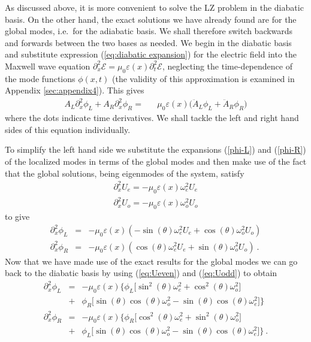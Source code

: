 \documentclass[twocolumn,english,pra,aps,superscriptaddress,floatfix]{revtex4-1}
\begin{document}
As discussed above, it is more convenient to solve the LZ  problem in the diabatic basis. On the other hand, the exact solutions we have already found are for the global modes, i.e.\ for the adiabatic basis. We shall therefore switch backwards and forwards between the two bases as needed. We begin in the diabatic basis and substitute expression (\ref{eq:diabatic expansion}) for the electric field into the Maxwell wave equation $\partial_{x}^{2} \mathcal{E} = \mu_{0} \varepsilon(x) \partial_{t}^{2} \mathcal{E}$, neglecting the time-dependence of the mode functions $\phi(x,t)$ (the validity of this approximation is examined in Appendix \ref{sec:appendix4}). This gives
\begin{eqnarray}
A_{L} \partial_{x}^{2} \phi_{L}+A_{R} \partial_{x}^2 \phi_{R} = & & \mu_{0} \varepsilon(x) \big(\ddot{A}_{L} \phi_{L} +\ddot{A}_{R}\phi_{R} \big) \label{eq:maxwell2b}
\end{eqnarray}
where the dots indicate time derivatives. We shall tackle the left and right hand sides of this equation individually. 

To simplify the left hand side we substitute the expansions (\ref{phi-L}) and (\ref{phi-R}) of the localized modes in terms of the global modes and then make use of the fact that the global solutions, being eigenmodes of the system, satisfy
\begin{eqnarray}
\partial_{x}^2 U_{e}= - \mu_{0} \varepsilon(x) \omega_{e}^2 U_{e} \\
\partial_{x}^2 U_{o}= - \mu_{0} \varepsilon(x) \omega_{o}^2 U_{o}
\end{eqnarray}
to give
\begin{eqnarray}
\partial_{x}^2 \phi_{L} & = & - \mu_{0} \varepsilon(x) \left(-\sin (\theta) \omega_{e}^2 U_{e}+ \cos (\theta) \omega_{o}^2 U_{o}\right) \\
\partial_{x}^2 \phi_{R} & = & - \mu_{0} \varepsilon(x) \left(\cos (\theta) \omega_{e}^2 U_{e}+ \sin (\theta) \omega_{o}^2 U_{o}\right) \ .
\end{eqnarray}
Now that we have made use of the exact results for the global modes we can go back to the diabatic basis by using (\ref{eq:Ueven}) and (\ref{eq:Uodd}) to obtain
\begin{eqnarray}
\partial_{x}^2 \phi_{L} & = & - \mu_{0} \varepsilon(x) \Big\{ \phi_{L} \big[\sin^{2}(\theta)  \omega_{e}^2 + \cos^{2} (\theta) \omega_{o}^2 \big] \nonumber \\
& + & \phi_{R} \big[\sin(\theta) \cos (\theta) \omega_{o}^2 -\sin(\theta) \cos (\theta) \omega_{e}^2 \big] \Big\}  \label{eq:lhs1a}\\
\partial_{x}^2 \phi_{R} & = & - \mu_{0} \varepsilon(x) \Big\{ \phi_{R} \big[\cos^{2}(\theta)  \omega_{e}^2 + \sin^{2} (\theta) \omega_{o}^2 \big] \nonumber \\
& + & \phi_{L} \big[\sin(\theta) \cos (\theta) \omega_{o}^2 - \sin(\theta) \cos (\theta) \omega_{e}^2 \big] \Big\} \ . \label{eq:lhs1b}
\end{eqnarray}
\end{document}

